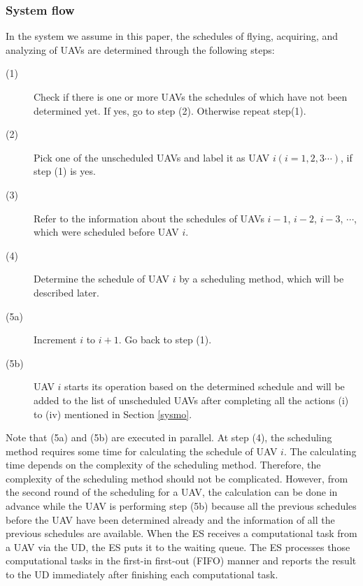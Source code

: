 \documentclass{ieeeaccess}
\begin{document}
\subsubsection{System flow}\label{flow}
In the system we assume in this paper, the schedules of flying, acquiring, and analyzing of UAVs are determined through the following steps:
%
\begin{description}
\item[(1)] Check if there is one or more UAVs the schedules of which have not been determined yet. If yes, go to step (2). Otherwise repeat step(1).
\item[(2)] Pick one of the unscheduled UAVs and label it as UAV $i (i=1, 2, 3\cdots)$, if step (1) is yes.
\item[(3)] Refer to the information about the schedules of UAVs $i-1$, $i-2$, $i-3$, $\cdots$, which were scheduled before UAV $i$.
\item[(4)] Determine the schedule of UAV $i$ by a scheduling method, which will be described later.
\item[(5a)] Increment $i$ to $i+1$. Go back to step (1).
\item[(5b)] UAV $i$ starts its operation based on the determined schedule and will be added to the list of unscheduled UAVs after completing all the actions\hspace{-0.5mm} (i) to (i\hspace{-.1em}v) mentioned in Section \ref{sysmo}.
\end{description}
%
Note that (5a) and (5b) are executed in parallel.
%
At step (4), the scheduling method requires some time for calculating the schedule of UAV $i$.
%
The calculating time depends on the complexity of the scheduling method.
%
Therefore, the complexity of the scheduling method should not be complicated.
%
However, from the second round of the scheduling for a UAV, the calculation can be done in advance while the UAV is performing step (5b) because all the previous schedules before the UAV have been determined already and the information of all the previous schedules are available.
%
%
When the ES receives a computational task from a UAV via the UD, the ES puts it to the waiting queue.
%
The ES processes those computational tasks in the first-in first-out (FIFO) manner and reports the result to the UD immediately after finishing each computational task.
\end{document}
